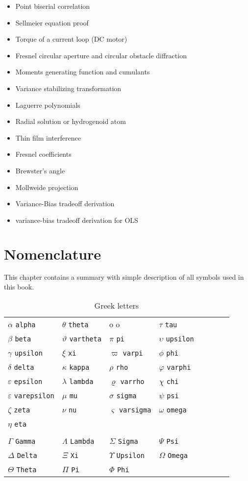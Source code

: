 \documentclass[12pt,a4paper,twoside,openright]{report}
\theoremstyle{definition}
\theoremstyle{itexmp}
\numberwithin{equation}{section}
\begin{document}
\begin{itemize}
\begin{itemize}[noitemsep]
			\item Point biserial correlation
			\item Sellmeier equation  proof
			\item Torque of a current loop (DC motor)
			\item Fresnel circular aperture and circular obstacle diffraction
			\item Moments generating function and cumulants
			\item Variance stabilizing transformation
			\item Laguerre polynomials
			\item Radial solution or hydrogenoid atom
			\item Thin film interference
			\item Fresnel coefficients
			\item Brewster's angle
			\item Mollweide projection
			\item Variance-Bias tradeoff derivation
			\item variance-bias tradeoff derivation for OLS
		\end{itemize}
	\end{itemize}

\chapter{Nomenclature}

This chapter contains a summary with simple description of all symbols used in this book.

	\begin{table}[H]
	\centering
	\begin{tabular}{*8l}
	$\alpha$ \verb?alpha? &$\theta$ \verb?theta? & o o &$\tau$ \verb?tau? \\
	$\beta$ \verb?beta? &$\vartheta$ \verb?vartheta? &$\pi$ \verb?pi?         &$\upsilon$ \verb?upsilon? \\
	$\gamma$ \verb?upsilon? &$\xi$ \verb?xi?  &$\varpi$ \verb?varpi? &$\phi$ \verb?phi?  \\
	$\delta$ \verb?delta? &$\kappa$ \verb?kappa? &$\rho$ \verb?rho? &$\varphi$ \verb?varphi? \\
	$\varepsilon$ \verb?epsilon? &$\lambda$ \verb?lambda? &$\varrho$ \verb?varrho? &$\chi$ \verb?chi?  \\
	$\varepsilon$ \verb?varepsilon? &$\mu$ \verb?mu? &$\sigma$ \verb?sigma? &$\psi$ \verb?psi? \\
	$\zeta$ \verb?zeta? &$\nu$ \verb?nu? &$\varsigma$ \verb?varsigma? &$\omega$ \verb?omega? \\
	$\eta$ \verb?eta?\\
    \\
	$\Gamma$ \verb?Gamma? &$\Lambda$ \verb?Lambda? &$\Sigma$ \verb?Sigma? &$\Psi$ \verb?Psi? \\
	$\Delta$ \verb?Delta? &$\Xi$ \verb?Xi? &$\Upsilon$ \verb?Upsilon? &$\Omega$ \verb?Omega?\\
	$\Theta$ \verb?Theta? &$\Pi$ \verb?Pi? &$\Phi$ \verb?Phi?
	\end{tabular}
	\caption{Greek letters}\label{greek}
	\end{table}
\end{document}
